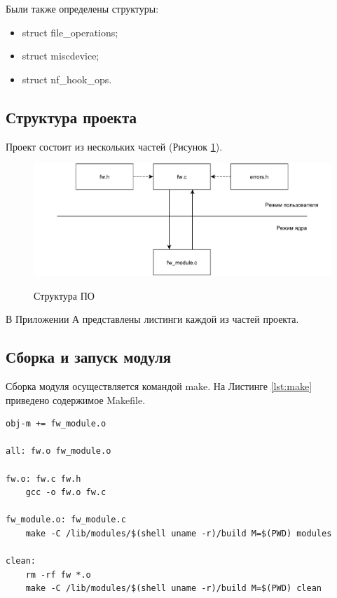 %
Были также определены структуры:
%
\begin{itemize}
	\item struct file\_operations;
	
	\item struct miscdevice;
	
	\item struct nf\_hook\_ops. \newline
\end{itemize}

\subsection{Структура проекта}
Проект состоит из нескольких частей (Рисунок \ref{fig30:image}).
\begin{figure}[h!]
	\begin{center}
		{\includegraphics[scale = 0.63]{img/struct.pdf}}
		\caption{Структура ПО}
		\label{fig30:image}
	\end{center}
\end{figure}

В Приложении А представлены листинги каждой из частей проекта. \newline

\subsection{Сборка и запуск модуля}
Сборка модуля осуществляется командой make. На Листинге \ref{lst:make} приведено содержимое Makefile.

\begin{lstlisting}[caption = {Makefile}, label=lst:make]
obj-m += fw_module.o

all: fw.o fw_module.o

fw.o: fw.c fw.h
	gcc -o fw.o fw.c	

fw_module.o: fw_module.c
	make -C /lib/modules/$(shell uname -r)/build M=$(PWD) modules

clean:
	rm -rf fw *.o
	make -C /lib/modules/$(shell uname -r)/build M=$(PWD) clean
\end{lstlisting}

